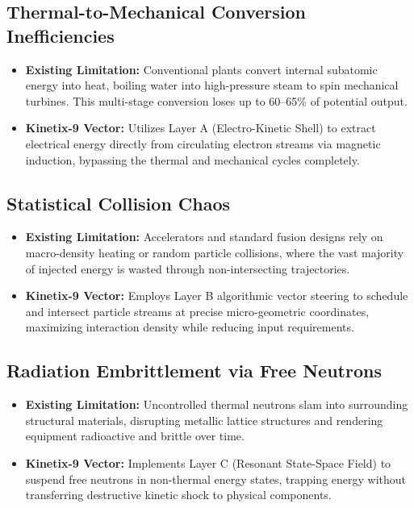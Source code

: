 \documentclass[11pt,a4paper]{article}
\begin{document}
\subsection{Thermal-to-Mechanical Conversion Inefficiencies}
\begin{itemize}
    \item \textbf{Existing Limitation:} Conventional plants convert internal subatomic energy into heat, boiling water into high-pressure steam to spin mechanical turbines. This multi-stage conversion loses up to 60--65\% of potential output.
    \item \textbf{Kinetix-9 Vector:} Utilizes Layer A (Electro-Kinetic Shell) to extract electrical energy directly from circulating electron streams via magnetic induction, bypassing the thermal and mechanical cycles completely.
\end{itemize}

\subsection{Statistical Collision Chaos}
\begin{itemize}
    \item \textbf{Existing Limitation:} Accelerators and standard fusion designs rely on macro-density heating or random particle collisions, where the vast majority of injected energy is wasted through non-intersecting trajectories.
    \item \textbf{Kinetix-9 Vector:} Employs Layer B algorithmic vector steering to schedule and intersect particle streams at precise micro-geometric coordinates, maximizing interaction density while reducing input requirements.
\end{itemize}

\subsection{Radiation Embrittlement via Free Neutrons}
\begin{itemize}
    \item \textbf{Existing Limitation:} Uncontrolled thermal neutrons slam into surrounding structural materials, disrupting metallic lattice structures and rendering equipment radioactive and brittle over time.
    \item \textbf{Kinetix-9 Vector:} Implements Layer C (Resonant State-Space Field) to suspend free neutrons in non-thermal energy states, trapping energy without transferring destructive kinetic shock to physical components.
\end{itemize}
\end{document}
